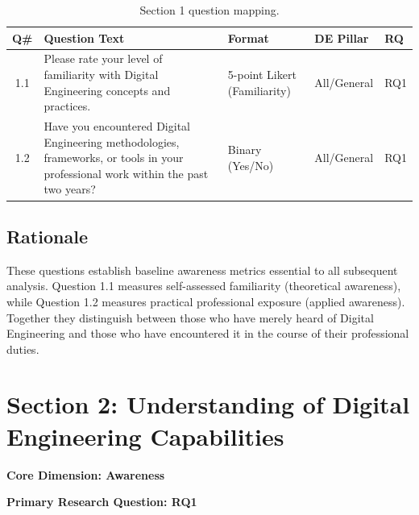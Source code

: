   \begin{table}[H]
    \centering
    \caption{Section 1 question mapping.}
    \label{tab:section1-mapping}
    \small
    \begin{tabular}{@{}cp{2.2in}p{1in}ll@{}}
      \toprule
      \textbf{Q\#} & \textbf{Question Text} & \textbf{Format} & \textbf{DE Pillar} & \textbf{RQ} \\
      \midrule
      1.1 & Please rate your level of familiarity with Digital Engineering concepts and practices. & 5-point Likert (Familiarity) & All/General & RQ1 \\
      1.2 & Have you encountered Digital Engineering methodologies, frameworks, or tools in your professional work within the past two years? & Binary (Yes/No) & All/General & RQ1 \\
      \bottomrule
    \end{tabular}
  \end{table}

  \subsection{Rationale}

  These questions establish baseline awareness metrics essential to all subsequent analysis. Question 1.1 measures self-assessed familiarity (theoretical awareness), while Question 1.2 measures practical professional exposure (applied awareness). Together they distinguish between those who have merely heard of Digital Engineering and those who have encountered it in the course of their professional duties.

  \section{Section 2: Understanding of Digital Engineering Capabilities}

  \textbf{Core Dimension: Awareness}

  \textbf{Primary Research Question: RQ1}

